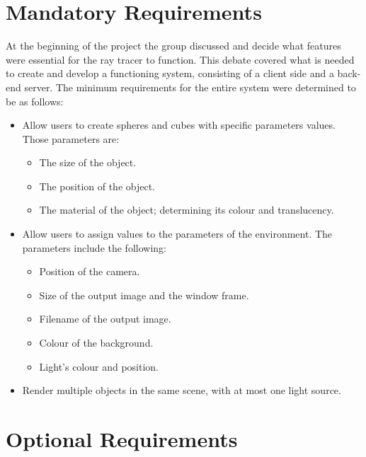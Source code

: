 \documentclass[a4paper]{report}
\begin{document}
	\section{Mandatory Requirements}
	
	At the beginning of the project the group discussed and decide what features were essential for the ray tracer to function. This debate covered what is needed to create and develop a functioning system, consisting of a client side and a back-end server. The minimum requirements for the entire system were determined to be as follows:
	\begin{itemize}
		\item Allow users to create spheres and cubes with specific parameters values. Those parameters are:
		\begin{itemize}
			\item The size of the object.
			\item The position of the object.
			\item The material of the object; determining its colour and translucency.
		\end{itemize}
		\item Allow users to assign values to the parameters of the environment. The parameters include the following:
		\begin{itemize}
			\item Position of the camera.
			\item Size of the output image and the window frame.
			\item Filename of the output image.
			\item Colour of the background.
			\item Light's colour and position.
		\end{itemize}
		\item Render multiple objects in the same scene, with at most one light source.
	\end{itemize}
	
	\section{Optional Requirements}
	
\end{document}

